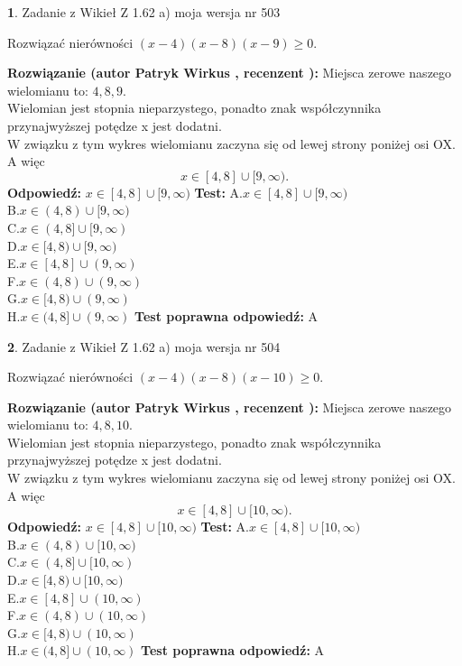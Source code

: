 \documentclass[12pt, a4paper]{article}
\theoremstyle{definition} %
\newtheorem{zad}{}
\newcommand{\zadStart}[1]{\begin{zad}#1\newline}
\newcommand{\zadStop}{\end{zad}}
\newcommand{\rozwStart}[2]{\noindent \textbf{Rozwiązanie (autor #1 , recenzent #2): }\newline}
\newcommand{\rozwStop}{\newline}
\newcommand{\odpStart}{\noindent \textbf{Odpowiedź:}\newline}
\newcommand{\odpStop}{\newline}
\newcommand{\testStart}{\noindent \textbf{Test:}\newline}
\newcommand{\testStop}{\newline}
\newcommand{\kluczStart}{\noindent \textbf{Test poprawna odpowiedź:}\newline}
\newcommand{\kluczStop}{\newline}
\begin{document}
\zadStart{Zadanie z Wikieł Z 1.62 a) moja wersja nr 503}

Rozwiązać nierówności $(x-4)(x-8)(x-9)\ge0$.
\zadStop
\rozwStart{Patryk Wirkus}{}
Miejsca zerowe naszego wielomianu to: $4, 8, 9$.\\
Wielomian jest stopnia nieparzystego, ponadto znak współczynnika przy\linebreak najwyższej potędze x jest dodatni.\\ W związku z tym wykres wielomianu zaczyna się od lewej strony poniżej osi OX. A więc $$x \in [4,8] \cup [9,\infty).$$
\rozwStop
\odpStart
$x \in [4,8] \cup [9,\infty)$
\odpStop
\testStart
A.$x \in [4,8] \cup [9,\infty)$\\
B.$x \in (4,8) \cup [9,\infty)$\\
C.$x \in (4,8] \cup [9,\infty)$\\
D.$x \in [4,8) \cup [9,\infty)$\\
E.$x \in [4,8] \cup (9,\infty)$\\
F.$x \in (4,8) \cup (9,\infty)$\\
G.$x \in [4,8) \cup (9,\infty)$\\
H.$x \in (4,8] \cup (9,\infty)$
\testStop
\kluczStart
A
\kluczStop



\zadStart{Zadanie z Wikieł Z 1.62 a) moja wersja nr 504}

Rozwiązać nierówności $(x-4)(x-8)(x-10)\ge0$.
\zadStop
\rozwStart{Patryk Wirkus}{}
Miejsca zerowe naszego wielomianu to: $4, 8, 10$.\\
Wielomian jest stopnia nieparzystego, ponadto znak współczynnika przy\linebreak najwyższej potędze x jest dodatni.\\ W związku z tym wykres wielomianu zaczyna się od lewej strony poniżej osi OX. A więc $$x \in [4,8] \cup [10,\infty).$$
\rozwStop
\odpStart
$x \in [4,8] \cup [10,\infty)$
\odpStop
\testStart
A.$x \in [4,8] \cup [10,\infty)$\\
B.$x \in (4,8) \cup [10,\infty)$\\
C.$x \in (4,8] \cup [10,\infty)$\\
D.$x \in [4,8) \cup [10,\infty)$\\
E.$x \in [4,8] \cup (10,\infty)$\\
F.$x \in (4,8) \cup (10,\infty)$\\
G.$x \in [4,8) \cup (10,\infty)$\\
H.$x \in (4,8] \cup (10,\infty)$
\testStop
\kluczStart
A
\kluczStop
\end{document}
